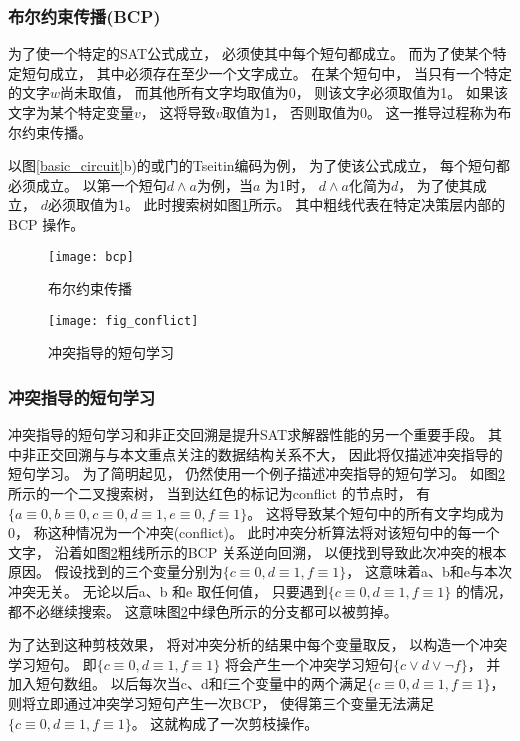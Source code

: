 \subsubsection{布尔约束传播(BCP)}
为了使一个特定的SAT公式成立，
必须使其中每个短句都成立。
而为了使某个特定短句成立，
其中必须存在至少一个文字成立。
在某个短句中，
当只有一个特定的文字$w$尚未取值，
而其他所有文字均取值为0，
则该文字必须取值为1。
如果该文字为某个特定变量$v$，
这将导致$v$取值为1，
否则取值为0。
这一推导过程称为布尔约束传播。

以图\ref{basic_circuit}b)的或门的Tseitin编码为例，
为了使该公式成立，
每个短句都必须成立。
以第一个短句$d \wedge a$为例，当$a$ 为1时，
$d \wedge a$化简为$d$，
为了使其成立，
$d$必须取值为1。
此时搜索树如图\ref{BCP}所示。
其中粗线代表在特定决策层内部的BCP 操作。

\begin{figure}[t] %
  \centering
  \texttt{[image: bcp]}
  \caption{布尔约束传播}
  \label{BCP}
\end{figure}
\begin{figure}[b] %
  \centering
  \texttt{[image: fig\_conflict]}
  \caption{冲突指导的短句学习}
  \label{confict}
\end{figure}

\subsubsection{冲突指导的短句学习}
冲突指导的短句学习和非正交回溯是提升SAT求解器性能的另一个重要手段。
其中非正交回溯与与本文重点关注的数据结构关系不大，
因此将仅描述冲突指导的短句学习。
为了简明起见，
仍然使用一个例子描述冲突指导的短句学习。
如图\ref{confict}所示的一个二叉搜索树，
当到达红色的标记为conflict 的节点时，
有$\{a \equiv 0,b \equiv 0, c \equiv 0,d \equiv1,e \equiv 0,f \equiv1\}$。
这将导致某个短句中的所有文字均成为0，
称这种情况为一个冲突(conflict)。
此时冲突分析算法将对该短句中的每一个文字，
沿着如图\ref{confict}粗线所示的BCP 关系逆向回溯，
以便找到导致此次冲突的根本原因。
假设找到的三个变量分别为$\{c \equiv 0,d \equiv 1,f \equiv 1\}$，
这意味着a、b和e与本次冲突无关。
无论以后a、b 和e 取任何值，
只要遇到$\{c \equiv 0,d \equiv 1,f \equiv 1\}$ 的情况，
都不必继续搜索。
这意味图\ref{confict}中绿色所示的分支都可以被剪掉。

为了达到这种剪枝效果，
将对冲突分析的结果中每个变量取反，
以构造一个冲突学习短句。
即$\{c \equiv 0, d \equiv 1, f \equiv 1\}$ 将会产生一个冲突学习短句$\{c\vee d \vee \neg f\}$，
并加入短句数组。
以后每次当c、d和f三个变量中的两个满足$\{c \equiv 0, d \equiv 1, f \equiv 1\}$，
则将立即通过冲突学习短句产生一次BCP，
使得第三个变量无法满足$\{c \equiv 0,d \equiv 1,f \equiv 1\}$。
这就构成了一次剪枝操作。



